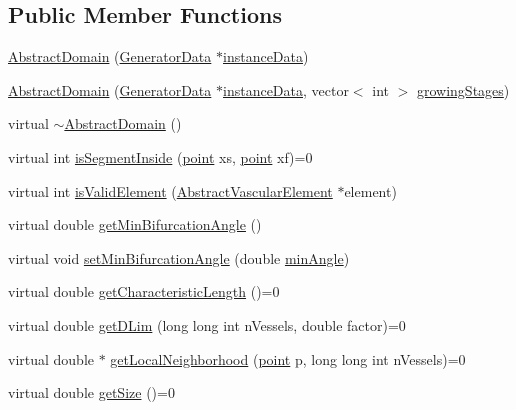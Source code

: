 \subsection*{Public Member Functions}
\begin{DoxyCompactItemize}
\item 
\hyperlink{class_abstract_domain_a18f82b7d0acdb24b3dcdf633510b200c}{Abstract\+Domain} (\hyperlink{class_generator_data}{Generator\+Data} $\ast$\hyperlink{class_abstract_domain_aa37fbabc2bfa92c574f7db7544016b53}{instance\+Data})
\item 
\hyperlink{class_abstract_domain_a145d5a70483d38c157934422da9d99b4}{Abstract\+Domain} (\hyperlink{class_generator_data}{Generator\+Data} $\ast$\hyperlink{class_abstract_domain_aa37fbabc2bfa92c574f7db7544016b53}{instance\+Data}, vector$<$ int $>$ \hyperlink{class_abstract_domain_a765dfd145f6559fc26cc0a36f1bf034a}{growing\+Stages})
\item 
virtual \hyperlink{class_abstract_domain_abad047cac0d8ac7c409864a4e051c67f}{$\sim$\+Abstract\+Domain} ()
\item 
virtual int \hyperlink{class_abstract_domain_a8544eef21fb6700ecc02e9cd50884efd}{is\+Segment\+Inside} (\hyperlink{structpoint}{point} xs, \hyperlink{structpoint}{point} xf)=0
\item 
virtual int \hyperlink{class_abstract_domain_aa151f29002e590832be02829772d38e1}{is\+Valid\+Element} (\hyperlink{class_abstract_vascular_element}{Abstract\+Vascular\+Element} $\ast$element)
\item 
virtual double \hyperlink{class_abstract_domain_a434417bad2396a2ee600932d1d2ded89}{get\+Min\+Bifurcation\+Angle} ()
\item 
virtual void \hyperlink{class_abstract_domain_a0b133239d168c9b70b4997b58d87cca7}{set\+Min\+Bifurcation\+Angle} (double \hyperlink{class_abstract_domain_afa74f9bbc9eb00511fa714ece659e24c}{min\+Angle})
\item 
virtual double \hyperlink{class_abstract_domain_a90ca3dff64bab2428da8ced24e16f4c3}{get\+Characteristic\+Length} ()=0
\item 
virtual double \hyperlink{class_abstract_domain_ac9f39c12182608eb704c051e5d1cbc55}{get\+D\+Lim} (long long int n\+Vessels, double factor)=0
\item 
virtual double $\ast$ \hyperlink{class_abstract_domain_aee2b549d19062b261429f8a442fb4714}{get\+Local\+Neighborhood} (\hyperlink{structpoint}{point} p, long long int n\+Vessels)=0
\item 
virtual double \hyperlink{class_abstract_domain_a049564d82f2c177c39834dfc8da143dc}{get\+Size} ()=0

\end{DoxyCompactItemize}

